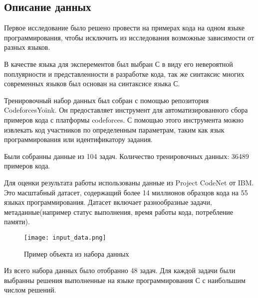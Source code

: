 \documentclass[../part_2.tex]{subfiles}
\begin{document}
    \subsection{Описание данных}
    \par Первое исследование было решено провести на примерах кода на одном языке программирования, чтобы исключить из исследования возможные зависимости от разных языков.
    \par В качестве языка для эксперементов был выбран С в виду его невероятной поплуярности и представленности в разработке кода, так же синтаксис многих современных языков был основан на синтаксисе языка С.
    \par Тренировочный набор данных был собран с помощью репозитория CodeforcesYoink\cite{codeforcesyoink, cfy_text}. Он предоставляет инструмент для автоматизированного сбора примеров кода с платформы codeforces. С помощью этого инструмента можно извлекать код участников по определенным параметрам, таким как язык программирования или идентификатору задания.
    \par Были собранны данные из 104 задач. Количество тренировочных данных: 36489 примеров кода.
    \par Для оценки результата работы использованы данные из Project CodeNet\cite{puri2021codenetlargescaleaicode} от IBM. Это масштабный датасет, содержащий более 14 миллионов образцов кода на 55 языках программирования. Датасет включает разнообразные задачи, метаданные(например статус выполнения, время работы кода, потребление памяти).
    \begin{figure}[H]
        \centering
        \texttt{[image: input\_data.png]}
        \caption{Пример объекта из набора данных}
    \end{figure}
    \par Из всего набора данных было отобранно 48 задач. Для каждой задачи были выбранны решения выполненные на языке программирования С с наибольшим числом решений.
\end{document}
